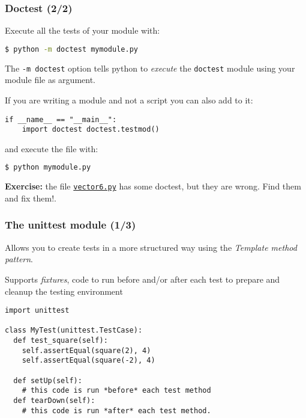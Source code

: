 \documentclass[english,serif,mathserif,xcolor=pdftex,dvipsnames,table]{beamer}
\begin{document}
\begin{frame}[fragile]
  \frametitle{Doctest (2/2)}

  Execute all the tests of your module with:

  \begin{lstlisting}[language=sh]
$ python -m doctest mymodule.py
  \end{lstlisting}

  \+
  The \lstinline|-m doctest| option tells python to \textit{execute} the
  \lstinline|doctest| module using your module file as argument.

  \+
  If you are writing a module and not a script you can also add to it:

  \begin{lstlisting}
if __name__ == "__main__":
    import doctest doctest.testmod()
  \end{lstlisting}

  and execute the file with:

  \begin{lstlisting}[language=sh]
$ python mymodule.py    
  \end{lstlisting}%
\end{frame}

\begin{frame}
\+ \textbf{Exercise:} the file
  \href{http://www.gc3.uzh.ch/vector6.py}{\texttt{vector6.py}}
  has some doctest, but they are wrong. Find them and fix them!.
\end{frame}


\begin{frame}[fragile]
  \frametitle{The unittest module (1/3)}
  Allows you to create tests in a more structured way using the
  \textit{Template method pattern}.

  \+
  Supports \textit{fixtures}, code to run before and/or after each
  test to prepare and cleanup the testing environment

  \begin{lstlisting}
import unittest

class MyTest(unittest.TestCase):
  def test_square(self):
    self.assertEqual(square(2), 4)
    self.assertEqual(square(-2), 4)

  def setUp(self):
    # this code is run *before* each test method
  def tearDown(self):
    # this code is run *after* each test method.    
  \end{lstlisting}
\end{frame}
\end{document}
